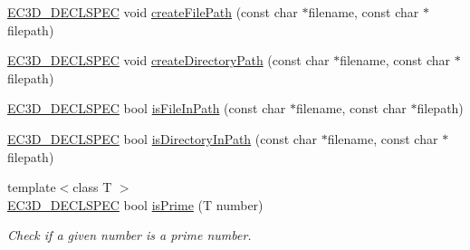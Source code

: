 \begin{DoxyCompactItemize}
\item 
\mbox{\hyperlink{_common_8h_aac42573e202ca3dd4d259c81691e2369}{E\+C3\+D\+\_\+\+D\+E\+C\+L\+S\+P\+EC}} void \mbox{\hyperlink{namespaceec_a5a8f3e18381f8cc15c31bd40029458a0}{create\+File\+Path}} (const char $\ast$filename, const char $\ast$filepath)
\item 
\mbox{\hyperlink{_common_8h_aac42573e202ca3dd4d259c81691e2369}{E\+C3\+D\+\_\+\+D\+E\+C\+L\+S\+P\+EC}} void \mbox{\hyperlink{namespaceec_aab3d6d61f368bf69b05e36f1f40ed05f}{create\+Directory\+Path}} (const char $\ast$filename, const char $\ast$filepath)
\item 
\mbox{\hyperlink{_common_8h_aac42573e202ca3dd4d259c81691e2369}{E\+C3\+D\+\_\+\+D\+E\+C\+L\+S\+P\+EC}} bool \mbox{\hyperlink{namespaceec_a2f3219c94de0f769108330a534dbbdc0}{is\+File\+In\+Path}} (const char $\ast$filename, const char $\ast$filepath)
\item 
\mbox{\hyperlink{_common_8h_aac42573e202ca3dd4d259c81691e2369}{E\+C3\+D\+\_\+\+D\+E\+C\+L\+S\+P\+EC}} bool \mbox{\hyperlink{namespaceec_a1ccd5223ec4ce469d1f79fbc29732d1a}{is\+Directory\+In\+Path}} (const char $\ast$filename, const char $\ast$filepath)
\item 
{\footnotesize template$<$class T $>$ }\\\mbox{\hyperlink{_common_8h_aac42573e202ca3dd4d259c81691e2369}{E\+C3\+D\+\_\+\+D\+E\+C\+L\+S\+P\+EC}} bool \mbox{\hyperlink{namespaceec_a56b1f3bdf5dbaf491d466504cdcfd972}{is\+Prime}} (T number)
\begin{DoxyCompactList}\small\item\em Check if a given number is a prime number. \end{DoxyCompactList}\end{DoxyCompactItemize}
